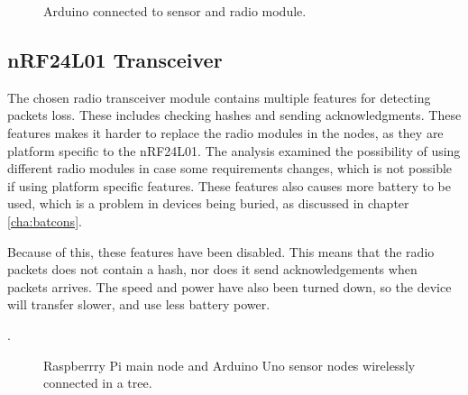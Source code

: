 \begin{figure}[!h]
	\centering
	\caption{Arduino connected to sensor and radio module.}
	\label{fig:compsketch}
\end{figure}

\subsection{nRF24L01 Transceiver}
The chosen radio transceiver module contains multiple features for detecting packets loss. These includes checking hashes and sending acknowledgments\cite{nf24datasheet}.
These features makes it harder to replace the radio modules in the nodes, as they are platform specific to the nRF24L01. The analysis examined the possibility of using different radio modules in case some requirements changes, which is not possible if using platform specific features. These features also causes more battery to be used, which is a problem in devices being buried, as discussed in chapter \ref{cha:batcons}.

Because of this, these features have been disabled. This means that the radio packets does not contain a hash, nor does it send acknowledgements when packets arrives. The speed and power have also been turned down, so the device will transfer slower, and use less battery power.

.

\begin{figure}[!h]
	\centering
	\caption{Raspberrry Pi main node and Arduino Uno sensor nodes wirelessly connected in a tree.}
	\label{fig:raspbuinoTree}
\end{figure}
